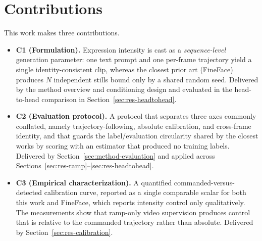 \section{Contributions}\label{sec:contributions}


\noindent This work makes three contributions.

\begin{itemize}
    \item \textbf{C1 (Formulation).} Expression intensity is cast as a \emph{sequence-level}
    generation parameter: one text prompt and one per-frame trajectory yield a single
    identity-consistent clip, whereas the closest prior art \citep{varanka2024fineface} (FineFace)
    produces $N$ independent stills bound only by a shared random seed. Delivered by the
    method overview and conditioning design and evaluated in the head-to-head comparison in Section~\ref{sec:res-headtohead}.
    \item \textbf{C2 (Evaluation protocol).} A protocol that separates three axes commonly
    conflated, namely trajectory-following, absolute calibration, and cross-frame
    identity, and that guards the label/evaluation circularity shared by the closest works
    by scoring with an estimator that produced no training labels. Delivered by
    Section~\ref{sec:method-evaluation} and applied across
    Sections~\ref{sec:res-ramp}--\ref{sec:res-headtohead}.
    \item \textbf{C3 (Empirical characterization).} A quantified commanded-versus-detected
    calibration curve, reported as a single comparable scalar for both this work and FineFace,
    which reports intensity control only qualitatively. The measurements show that ramp-only video
    supervision produces control that is relative to the commanded trajectory rather than absolute. 
    Delivered by Section~\ref{sec:res-calibration}.
\end{itemize}

